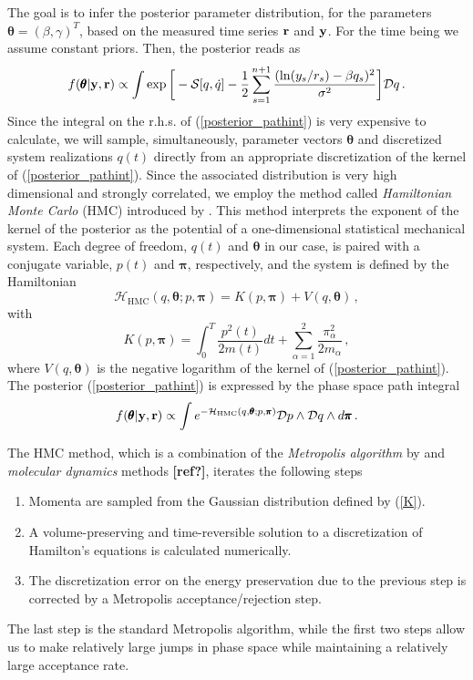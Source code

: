 \documentclass[11pt, a4paper]{article}
\newcommand{\vc}[1]{{\bf #1 }}
\newcommand{\bt}{\pmb\theta}
\begin{document}
The goal is to infer the posterior parameter distribution, for the parameters $\bt=(\beta,\gamma)^T$, based on the measured time series $\vc r$ and $\vc y$.
For the time being we assume constant priors.
Then, the posterior reads as
\begin{equation}\label{posterior_pathint}
  f(\bt | \vc y, \vc r)
  \propto
  \int
  \exp\bigg[
    -{{\mathcal S}}[{q},\dot q]
    -\frac{1}{2}
    \sum_{s=1}^{n+1}
    \frac
    {(\ln(y_s/r_s)-{\beta q_s})^2}
    {\sigma^2}
  \bigg]
  {\mathcal Dq}
  \,.
\end{equation}
Since the integral on the r.h.s. of (\ref{posterior_pathint}) is very expensive to calculate, we will sample, simultaneously, parameter vectors $\bt$ and discretized system realizations $q(t)$ directly from an appropriate discretization of the kernel of (\ref{posterior_pathint}).
Since the associated distribution is very high dimensional and strongly correlated, we employ the method called {\em Hamiltonian Monte Carlo} (HMC) introduced by \cite{duane_1987_HMC}.
This method interprets the exponent of the kernel of the posterior as the potential of a one-dimensional statistical mechanical system. Each degree of freedom, $q(t)$ and $\bt$ in our case, is paired with a conjugate variable, $p(t)$ and ${\pmb\pi}$, respectively, and the system is defined by the  Hamiltonian
\begin{equation}\label{Hamiltonian}
    \mathcal{H}_{\text{HMC}}(q,\bt; p,{\pmb\pi})
    =
    K( p,{\pmb\pi}) + V( q,\bt)\,,
\end{equation}
with
\begin{equation}\label{K}
   K( p,{\pmb\pi})
   =
   \int_0^T \frac{ p^2(t)}{2m(t)}dt
   + \sum_{\alpha=1}^2\frac{\pi_\alpha^2}{2m_\alpha}\,,
\end{equation}
where $V( q,\bt)$ is the negative logarithm of the kernel of (\ref{posterior_pathint}).
The posterior (\ref{posterior_pathint}) is expressed by the phase space path integral
\begin{equation}\label{phaseSpacePathInt}
    f(\bt | \vc y, \vc r)
  \propto
  \int
  e^{-\mathcal {H}_{\text{HMC}}(q,\bt; p,{\pmb\pi})}
  {\mathcal Dp}
  \wedge
  {\mathcal Dq}
  \wedge
  d{\pmb\pi}
  \,.
\end{equation}

The HMC method, which is a combination of the {\em Metropolis algorithm} by \cite{metropolis_1953_MRT2} and {\em molecular dynamics} methods \textbf{[ref?]}, iterates the following steps
\begin{enumerate}
  \item
  Momenta are sampled from the Gaussian distribution defined by (\ref{K}).
  \item
  A volume-preserving and time-reversible solution to a discretization of Hamilton's equations is calculated numerically.
  \item
  The discretization error on the energy preservation due to the previous step is corrected by a Metropolis acceptance/rejection step.
\end{enumerate}
The last step is the standard Metropolis algorithm, while the first two steps allow us to make relatively large jumps in phase space while maintaining a relatively large acceptance rate.
\end{document}
